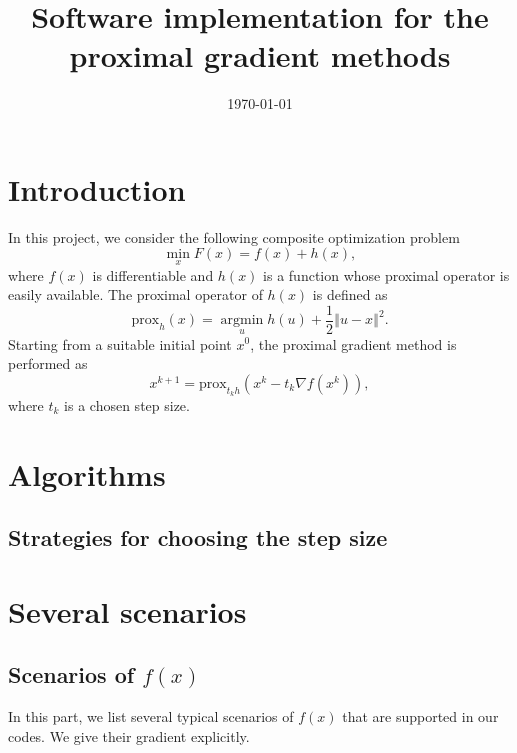 \documentclass[a4paper]{article}
\title{Software implementation for the proximal gradient methods}
\author{}
\date{\today}
\newcommand{\norm}[1]{\left\Vert#1\right\Vert}
\newcommand{\prox}{\mathrm{prox}}
\begin{document}
\maketitle
\tableofcontents

\section{Introduction}
\label{sec:intro}
In this project, we consider the following composite optimization 
problem
\begin{equation}
  \min\limits_{x} F(x) = f(x) + h(x),
\end{equation}
where $f(x)$ is differentiable and $h(x)$ is a function whose 
proximal operator is easily available.
The proximal operator of $h(x)$ is defined as
\begin{displaymath}
  \prox_h(x) = \mathop{\arg\min}\limits_{u} h(u) + \frac{1}{2} 
  \norm{u - x}^2.
\end{displaymath}
Starting from a suitable initial point $x^0$, the proximal gradient 
method is performed as
\begin{displaymath}
  x^{k+1} = \prox_{t_k h} (x^k - t_k \nabla f(x^k)),
\end{displaymath}
where $t_k$ is a chosen step size.


\section{Algorithms}
\label{sec:alg}

\subsection{Strategies for choosing the step size}






\section{Several scenarios}
\label{sec:cal}

\subsection{Scenarios of $f(x)$}
\label{sec:cal_f}
In this part, we list several typical scenarios of $f(x)$ that are 
supported in our codes. We give their gradient explicitly.
\end{document}
